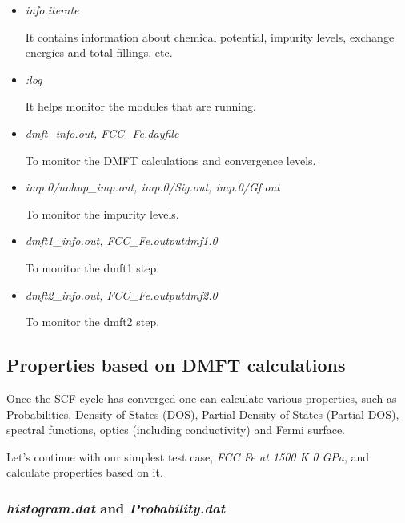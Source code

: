 \documentclass[12 pt]{article}
\begin{document}
	\begin{itemize}

	 \item \emph{info.iterate}

  It contains information about chemical potential, impurity levels, exchange energies and total fillings, etc. 

	\item \emph{:log}

  It helps monitor the modules that are running.

	\item \emph{dmft\_info.out, FCC\_Fe.dayfile}

  To monitor the DMFT calculations and convergence levels.

	\item \emph{imp.0/nohup\_imp.out, imp.0/Sig.out, imp.0/Gf.out}

  To monitor the impurity levels. 

	\item \emph{dmft1\_info.out, FCC\_Fe.outputdmf1.0}

  To monitor the dmft1 step. 

	\item \emph{dmft2\_info.out, FCC\_Fe.outputdmf2.0}

  To monitor the dmft2 step.

	\end{itemize}

  
  \cleardoublepage

      \subsection{Properties based on DMFT calculations}

  Once the SCF cycle has converged one can calculate various properties, such as Probabilities, Density of States 
(DOS), Partial Density of States (Partial DOS), spectral functions, optics (including conductivity) and Fermi surface.

  Let's continue with our simplest test case, \emph{FCC Fe at 1500 K 0 GPa}, and calculate properties based on it.

	\subsubsection{\emph{histogram.dat} and \emph{Probability.dat}}
\end{document}
